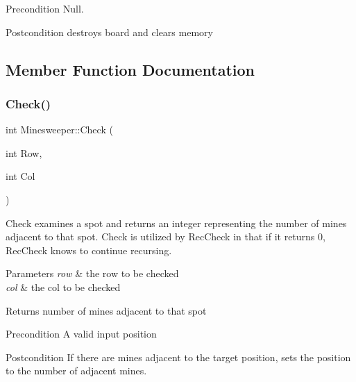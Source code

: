 \begin{DoxyPrecond}{Precondition}
Null. 
\end{DoxyPrecond}
\begin{DoxyPostcond}{Postcondition}
destroys board and clears memory 
\end{DoxyPostcond}


\subsection{Member Function Documentation}
\mbox{\label{classMinesweeper_a2c4f9e490db8fda6bef5cd5c532c49e5}} 
\subsubsection{\texorpdfstring{Check()}{Check()}}
{\footnotesize\ttfamily int Minesweeper\+::\+Check (\begin{DoxyParamCaption}\item[{int}]{Row,  }\item[{int}]{Col }\end{DoxyParamCaption})\hspace{0.3cm}{\ttfamily [private]}}

Check examines a spot and returns an integer representing the number of mines adjacent to that spot. Check is utilized by Rec\+Check in that if it returns 0, Rec\+Check knows to continue recursing. 
\begin{DoxyParams}{Parameters}
{\em row} & the row to be checked \\
\hline
{\em col} & the col to be checked \\
\hline
\end{DoxyParams}
\begin{DoxyReturn}{Returns}
number of mines adjacent to that spot 
\end{DoxyReturn}
\begin{DoxyPrecond}{Precondition}
A valid input position 
\end{DoxyPrecond}
\begin{DoxyPostcond}{Postcondition}
If there are mines adjacent to the target position, sets the position to the number of adjacent mines. 
\end{DoxyPostcond}
\mbox{\label{classMinesweeper_a8abe207bf94f14d33c10dc88410e6f8c}} 
